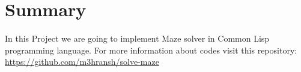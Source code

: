 \section*{Summary}
\paragraph{}
In this Project we are going to implement Maze solver in Common Lisp programming language.
For more information about codes visit this repository:
\newline
\newline
\href{https://github.com/m3hransh/solve-maze}{https://github.com/m3hransh/solve-maze}